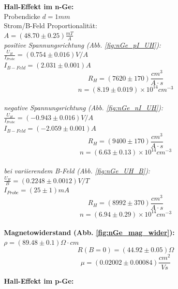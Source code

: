 \documentclass[12pt,a4paper]{article}
\begin{document}
\begin{multicols}{2}

\noindent \textbf{Hall-Effekt im n-Ge:}\\
Probendicke $d=1mm$\\
Strom/B-Feld Proportionalität:\\
$A=(48.70 \pm 0.25)\frac{mT}{A}$\\

\noindent \emph{positive Spannungsrichtung (Abb. \ref{fig:nGe_pI_UH}):}\\

\noindent$\frac{U_H}{I_{Probe}}=(0.754\pm 0.016)V/A$\\
$I_{B-Feld}=(2.031 \pm 0.001)A$\\
$$R_H=(7620 \pm 170)\frac{cm^3}{A\cdot s}$$
$$n=(8.19\pm 0.019)\times 10^{14}cm^{-3}$$\\


\noindent \emph{negative Spannungsrichtung (Abb. \ref{fig:nGe_nI_UH}):}\\

\noindent$\frac{U_H}{I_{Probe}}=(-0.943\pm 0.016)V/A$\\
$I_{B-Feld}=(-2.059 \pm 0.001)A$\\
$$R_H=(9400 \pm 170)\frac{cm^3}{A\cdot s}$$
$$n=(6.63\pm 0.13)\times 10^{14}cm^{-3}$$\\


\noindent \emph{bei variierendem B-Feld (Abb. \ref{fig:nGe_UH_B}):}\\

\noindent$\frac{U_H}{B}=(0.2248\pm 0.0012)V/T$\\
$I_{Probe}=(25 \pm 1)mA$\\
$$R_H=(8992 \pm 370)\frac{cm^3}{A\cdot s}$$
$$n=(6.94\pm 0.29)\times 10^{14}cm^{-3}$$\\


\noindent \textbf{Magnetowiderstand (Abb. \ref{fig:nGe_mag_wider}):}\\
$\rho=(89.48\pm 0.1)\Omega \cdot cm$
$$R(B=0)=(44.92 \pm 0.05) \Omega$$
$$\mu=(0.02002 \pm 0.00084)\frac{cm^2}{Vs}$$



\pagebreak

\noindent \textbf{Hall-Effekt im p-Ge:}\\
\end{multicols}

\end{document}
